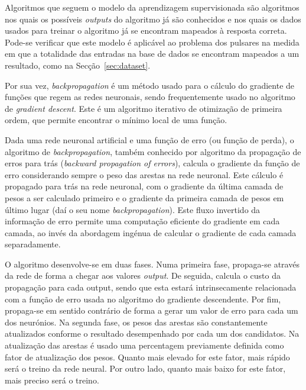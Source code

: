 \documentclass[]{article}
\begin{document}
    Algoritmos que seguem o modelo da aprendizagem supervisionada são algoritmos nos quais os possíveis \textit{outputs} do algoritmo já são conhecidos e nos quais os dados usados para treinar o algoritmo já se encontram mapeados à resposta correta. Pode-se verificar que este modelo é aplicável ao problema dos pulsares na medida em que a totalidade das entradas na base de dados se encontram mapeados a um resultado, como na Secção~\ref{sec:dataset}.
    
    Por sua vez, \textit{backpropagation} é um método usado para o cálculo do gradiente de funções que regem as redes neuronais, sendo frequentemente usado no algoritmo de \textit{gradient descent}. Este é um algoritmo iterativo de otimização de primeira ordem, que permite encontrar o mínimo local de uma função.
    
	Dada uma rede neuronal artificial e uma função de erro (ou função de perda), o algoritmo de \textit{backpropagation}, também conhecido por algoritmo da propagação de erros para trás (\textit{backward propagation of errors}), calcula o gradiente da função de erro considerando sempre o peso das arestas na rede neuronal. Este cálculo é propagado para trás na rede neuronal, com o gradiente da última camada de pesos a ser calculado primeiro e o gradiente da primeira camada de pesos em último lugar (daí o seu nome \textit{backpropagation}). Este fluxo invertido da informação de erro permite uma computação eficiente do gradiente em cada camada, ao invés da abordagem ingénua de calcular o gradiente de cada camada separadamente.
    
    O algoritmo desenvolve-se em duas fases. Numa primeira fase, propaga-se através da rede de forma a chegar aos valores \textit{output}. De seguida, calcula o custo da propagação para cada output, sendo que esta estará intrinsecamente relacionada com a função de erro usada no algoritmo do gradiente descendente. Por fim, propaga-se em sentido contrário de forma a gerar um valor de erro para cada um dos neurónios. Na segunda fase, os pesos das arestas são constantemente atualizados conforme o resultado desempenhado por cada um dos candidatos. Na atualização das arestas é usado uma percentagem previamente definida como fator de atualização dos pesos. Quanto mais elevado for este fator, mais rápido será o treino da rede neural. Por outro lado, quanto mais baixo for este fator, mais preciso será o treino.
    
    
\end{document}
